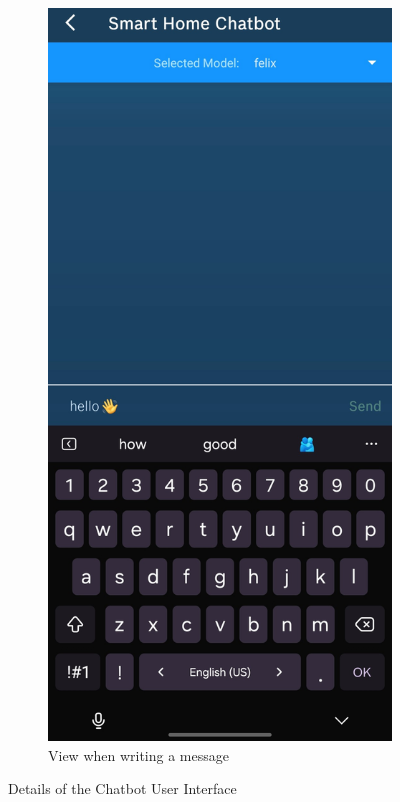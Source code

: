 \begin{figure}[b]
\begin{subfigure}[t]{.48\textwidth}
        \includegraphics[width=\textwidth]{graphics/keyboard.jpg}
        \caption{View when writing a message}
        \label{fig:keyboard}
        \end{subfigure}
      \caption{Details of the Chatbot User Interface}
      \label{fig:ui-details}
\end{figure}


